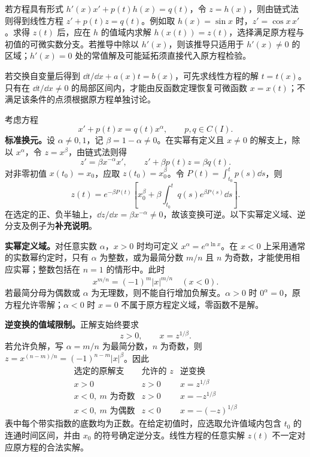 若方程具有形式 $h'(x)x'+p(t)h(x)=q(t)$，令 $z=h(x)$，则由链式法则得到线性方程 $z'+p(t)z=q(t)$。例如取 $h(x)=\sin x$ 时，$z'=\cos x\,x'$。求得 $z(t)$ 后，应在 $h$ 的值域内求解 $h(x(t))=z(t)$，选择满足原方程与初值的可微实数分支。若推导中除以 $h'(x)$，则该推导只适用于 $h'(x)\ne0$ 的区域；$h'(x)=0$ 处的常值解及可能延拓须直接代入原方程检验。

若交换自变量后得到 $\dd t/\dd x+a(x)t=b(x)$，可先求线性方程的解 $t=t(x)$。只有在 $\dd t/\dd x\ne0$ 的局部区间内，才能由反函数定理恢复可微函数 $x=x(t)$；不满足该条件的点须根据原方程单独讨论。

考虑方程
\[
x'+p(t)x=q(t)x^\alpha,\qquad p,q\in C(I).
\]
\textbf{标准换元。}设 $\alpha\ne0,1$，记 $\beta=1-\alpha\ne0$。在实幂有定义且 $x\ne0$ 的解支上，除以 $x^\alpha$，令 $z=x^\beta$，由链式法则得
\[
z'=\beta x^{-\alpha}x',\qquad
\boxed{z'+\beta p(t)z=\beta q(t).}
\]
对非零初值 $x(t_0)=x_0$，应取 $z(t_0)=x_0^\beta$。令 $P(t)=\int_{t_0}^t p(s)\dd s$，则
\[
z(t)=e^{-\beta P(t)}\left[x_0^\beta+
\beta\int_{t_0}^t q(s)e^{\beta P(s)}\dd s\right].
\]
在选定的正、负半轴上，$\dd z/\dd x=\beta x^{-\alpha}\ne0$，故该变换可逆。以下实幂定义域、逆分支及例子为\textbf{补充说明}。

\textbf{实幂定义域。}对任意实数 $\alpha$，$x>0$ 时均可定义 $x^\alpha=e^{\alpha\ln x}$。在 $x<0$ 上采用通常的实数幂约定时，只有 $\alpha$ 为整数，或为最简分数 $m/n$ 且 $n$ 为奇数，才能使用相应实幂；整数包括在 $n=1$ 的情形中。此时
\[
x^{m/n}=(-1)^m|x|^{m/n}\quad(x<0).
\]
若最简分母为偶数或 $\alpha$ 为无理数，则不能自行增加负解支。$\alpha>0$ 时 $0^\alpha=0$，原方程允许零解；$\alpha<0$ 时 $x=0$ 不属于原方程定义域，零函数不是解。

\textbf{逆变换的值域限制。}正解支始终要求
\[
\boxed{z>0,\qquad x=z^{1/\beta}.}
\]
若允许负解，写 $\alpha=m/n$ 为最简分数，$n$ 为奇数，则 $z=x^{(n-m)/n}=(-1)^{n-m}|x|^\beta$。因此
\[
\begin{array}{c|c|c}
\text{选定的原解支}&\text{允许的 }z&\text{逆变换}\\\hline
x>0&z>0&x=z^{1/\beta}\\
x<0,\ m\text{ 为奇数}&z>0&x=-z^{1/\beta}\\
x<0,\ m\text{ 为偶数}&z<0&x=-(-z)^{1/\beta}
\end{array}
\]
表中每个带实指数的底数均为正数。在给定初值时，应选取允许值域内包含 $t_0$ 的连通时间区间，并由 $x_0$ 的符号确定逆分支。线性方程的任意实解 $z(t)$ 不一定对应原方程的合法实解。

